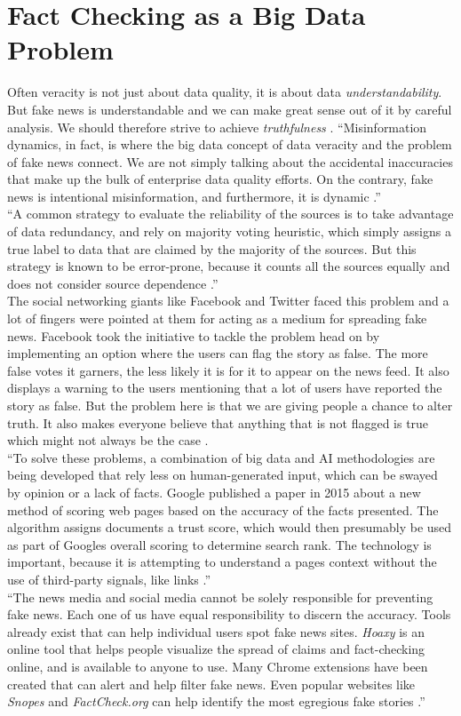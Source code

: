 \documentclass[sigconf]{acmart}
\begin{document}
\section{Fact Checking as a Big Data Problem}
Often veracity is not just about data quality, it is about data \textit{understandability}. But fake news is understandable and we can make great sense out of it by careful analysis. We should therefore strive to achieve \textit{truthfulness} \cite{www-forbes2}. ``Misinformation dynamics, in fact, is where the big data concept of data veracity and the problem of fake news connect. We are not simply talking about the accidental inaccuracies that make up the bulk of enterprise data quality efforts. On the contrary, fake news is intentional misinformation, and furthermore, it is dynamic \cite{www-forbes2}.''  \\
``A common strategy to evaluate the reliability of the sources is to take advantage of data redundancy, and rely on majority voting heuristic, which simply assigns a true label to data that are claimed by the majority of the sources. But this strategy is known to be error-prone, because it counts all the sources equally and does not consider source dependence \cite{www-forbes1}.'' \\ 
The social networking giants like Facebook and Twitter faced this problem and a lot of fingers were pointed at them for acting as a medium for spreading fake news. Facebook took the initiative to tackle the problem head on by implementing an option where the users can flag the story as false. The more false votes it garners, the less likely it is for it to appear on the news feed. It also displays a warning to the users mentioning that a lot of users have reported the story as false. But the problem here is that we are giving people a chance to alter truth. It also makes everyone believe that anything that is not flagged is true which might not always be the case \cite{www-forbes2} . \\ 
``To solve these problems, a combination of big data and AI methodologies are being developed that rely less on human-generated input, which can be swayed by opinion or a lack of facts. Google published a paper in 2015 about a new method of scoring web pages based on the accuracy of the facts presented. The algorithm assigns documents a trust score, which would then presumably be used as part of Google\textquotesingle s overall scoring to determine search rank. The technology is important, because it is attempting to understand a page\textquotesingle s context without the use of third-party signals, like links \cite{www-forbes1}.''  \\
``The news media and social media cannot be solely responsible for preventing fake news. Each one of us have equal responsibility to discern the accuracy. Tools already exist that can help individual users spot fake news sites. \textit{Hoaxy} is an online tool that helps people visualize the spread of claims and fact-checking online, and is available to anyone to use. Many Chrome extensions have been created that can alert and help filter fake news. Even popular websites like \textit{Snopes} and \textit{FactCheck.org} can help identify the most egregious fake stories \cite{www-forbes2}.''
\end{document}
